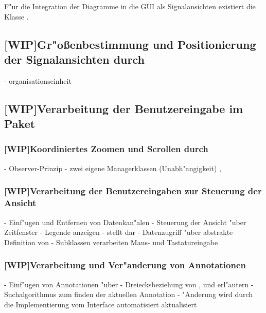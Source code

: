 F"ur die Integration der Diagramme in die \ac{GUI} als Signalansichten existiert die Klasse .

\subsection{[WIP]Gr"o{\ss}enbestimmung und Positionierung der Signalansichten durch }
\label{sec:signalpanel_organisation}

- organisationseinheit

\subsection{[WIP]Verarbeitung der Benutzereingabe im Paket }


\subsubsection{[WIP]Koordiniertes Zoomen und Scrollen durch }

- Observer-Prinzip
- zwei eigene Managerklassen (Unabh"angigkeit) , 

\subsubsection{[WIP]Verarbeitung der Benutzereingaben zur Steuerung der Ansicht}

- Einf"ugen und Entfernen von Datenkan"alen
- Steuerung der Ansicht "uber Zeitfenster
- Legende anzeigen
-  stellt dar
- Datenzugriff "uber abstrakte Definition von 
- Subklassen verarbeiten Maus- und Tastatureingabe

\subsubsection{[WIP]Verarbeitung und Ver"anderung von Annotationen}

- Einf"ugen von Annotationen "uber 
- Dreiecksbeziehung von ,  und  erl"autern
- Suchalgorithmus zum finden der aktuellen Annotation
- "Anderung wird durch die Implementierung vom Interface  automatisiert aktualisiert

